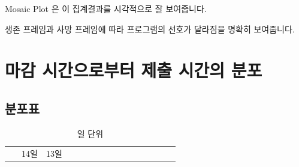 \documentclass[
]{book}
\begin{document}
Mosaic Plot 은 이 집계결과를 시각적으로 잘 보여줍니다.

생존 프레임과 사망 프레임에 따라 프로그램의 선호가 달라짐을 명확히 보여줍니다.

\section{마감 시간으로부터 제출 시간의 분포}\label{uxb9c8uxac10-uxc2dcuxac04uxc73cuxb85cuxbd80uxd130-uxc81cuxcd9c-uxc2dcuxac04uxc758-uxbd84uxd3ec-18}

\subsection{분포표}\label{uxbd84uxd3ecuxd45c-19}

\begin{longtable}[]{@{}
  >{\raggedright\arraybackslash}p{}
  >{\centering\arraybackslash}p{}
  >{\centering\arraybackslash}p{}
  >{\centering\arraybackslash}p{}
  >{\centering\arraybackslash}p{}
  >{\centering\arraybackslash}p{}
  >{\centering\arraybackslash}p{}
  >{\centering\arraybackslash}p{}
  >{\centering\arraybackslash}p{}
  >{\centering\arraybackslash}p{}
  >{\centering\arraybackslash}p{}
  >{\centering\arraybackslash}p{}
  >{\centering\arraybackslash}p{}
  >{\centering\arraybackslash}p{}
  >{\centering\arraybackslash}p{}
  >{\centering\arraybackslash}p{}@{}}
\caption{일 단위}\tabularnewline
\toprule\noalign{}
\begin{minipage}[b]{\linewidth}\raggedright
~
\end{minipage} & \begin{minipage}[b]{\linewidth}\centering
14일
\end{minipage} & \begin{minipage}[b]{\linewidth}\centering
13일
\end{minipage} & \begin{minipage}[b]{\linewidth}\centering

\end{minipage}
\end{longtable}
\end{document}
